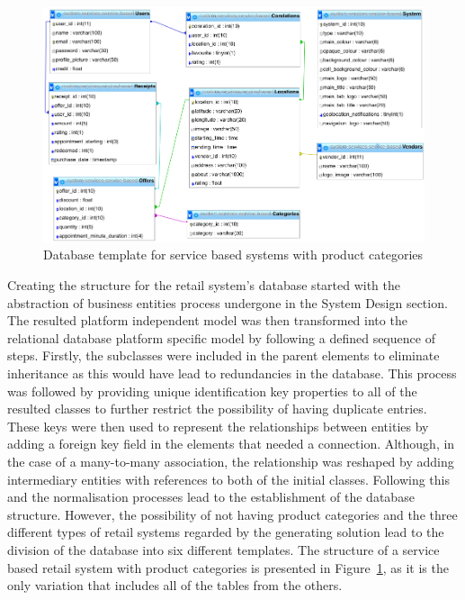 \begin{figure}[!ht]
\centering
\includegraphics[scale=0.4]{img/database_structure.png}
\caption{Database template for service based systems with product categories}
\label{fig:database_structure}
\end{figure}

Creating the structure for the retail system's database started with the abstraction of business entities process undergone in the System Design section. The resulted platform independent model was then transformed into the relational database platform specific model by following a defined sequence of steps. Firstly, the subclasses were included in the parent elements to eliminate inheritance as this would have lead to redundancies in the database. This process was followed by providing unique identification key properties to all of the resulted classes to further restrict the possibility of having duplicate entries. These keys were then used to represent the relationships between entities by adding a foreign key field in the elements that needed a connection. Although, in the case of a many-to-many association, the relationship was reshaped by adding intermediary entities with references to both of the initial classes. Following this and the normalisation processes lead to the establishment of the database structure. However, the possibility of not having product categories and the three different types of retail systems regarded by the generating solution lead to the division of the database into six different templates. The structure of a service based retail system with product categories is presented in Figure~\ref{fig:database_structure}, as it is the only variation that includes all of the tables from the others.\\


